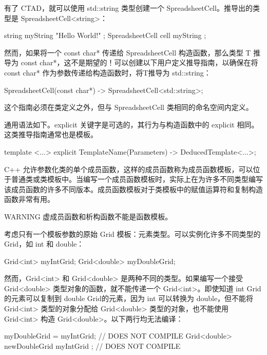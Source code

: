 有了 CTAD，就可以使用 std::string 类型创建一个 SpreadsheetCell。推导出的类型是 SpreadsheetCell<string>：

\begin{cpp}
string myString { "Hello World!" };
SpreadsheetCell cell { myString };
\end{cpp}

然而，如果将一个 const char* 传递给 SpreadsheetCell 构造函数，那么类型 T 推导为 const char*，这不是期望的！可以创建以下用户定义推导指南，以确保在将 const char* 作为参数传递给构造函数时，将T推导为 std::string：

\begin{cpp}
SpreadsheetCell(const char*) -> SpreadsheetCell<std::string>;
\end{cpp}

这个指南必须在类定义之外，但与 SpreadsheetCell 类相同的命名空间内定义。

通用语法如下。explicit 关键字是可选的，其行为与构造函数中的 explicit 相同。这类推导指南通常也是模板。

\begin{cpp}
template <...>
explicit TemplateName(Parameters) -> DeducedTemplate<...>;
\end{cpp}


C++ 允许参数化类的单个成员函数，这样的成员函数称为成员函数模板，可以位于普通类或类模板中。当编写一个成员函数模板时，实际上在为许多不同类型编写该成员函数的许多不同版本。成员函数模板对于类模板中的赋值运算符和复制构造函数非常有用。

\begin{myWarning}{WARNING}
虚成员函数和析构函数不能是函数模板。
\end{myWarning}

考虑只有一个模板参数的原始 Grid 模板：元素类型。可以实例化许多不同类型的Grid，如 int 和 double：

\begin{cpp}
Grid<int> myIntGrid;
Grid<double> myDoubleGrid;
\end{cpp}

然而，Grid<int> 和 Grid<double> 是两种不同的类型。如果编写一个接受 Grid<double> 类型对象的函数，就不能传递一个 Grid<int>。即使知道 int Grid的元素可以复制到 double Grid的元素，因为 int 可以转换为 double，但不能将 Grid<int> 类型的对象分配给 Grid<double> 类型的对象，也不能使用 Grid<int> 构造 Grid<double>。以下两行均无法编译：

\begin{cpp}
myDoubleGrid = myIntGrid; // DOES NOT COMPILE
Grid<double> newDoubleGrid { myIntGrid }; // DOES NOT COMPILE
\end{cpp}

